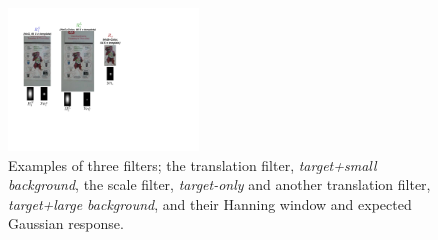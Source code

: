 \documentclass{bmvc2k}
\begin{document}
\begin{figure}[!h]
\centering
\includegraphics[width=0.45\textwidth]{figures/Filters_Details.pdf}
\caption{Examples of three filters; the translation filter,
  \textit{target+small background}, the scale filter,
  \textit{target-only} and another translation filter,
  \textit{target+large background}, and their Hanning window and
  expected Gaussian response.}
\label{fig:Filters}
\end{figure}
\end{document}
